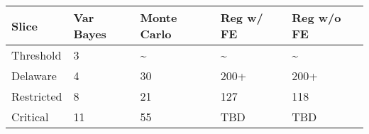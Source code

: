 \begin{tabular}{lllll}
  \hline
Slice & Var Bayes & Monte Carlo & Reg w/ FE & Reg w/o FE \\ 
  \hline
Threshold & 3 & \~{} & \~{} & \~{} \\ 
  Delaware & 4 & 30 & 200+ & 200+ \\ 
  Restricted & 8 & 21 & 127 & 118 \\ 
  Critical & 11 & 55 & TBD & TBD \\ 
   \hline
\end{tabular}
